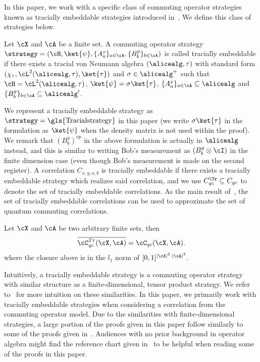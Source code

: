 In this paper, we work with a specific class of commuting operator strategies known as tracially embeddable strategies introduced in~\cite{linTracialEmbeddableStrategies2024}. We define this class of strategies below.
\begin{definition} \label{def:Tracialemd}
	Let $\cX$ and $\cA$ be a finite set. A commuting operator strategy $\strategy = (\cH, \ket{\psi},\{A_a^x \}_{a \in \cA} , \{B_b^y\}_{b \in \cA})$ is called tracially embeddable if there exists a tracial von Neumann algebra $(\alicealg, \tau)$ with standard form $(\chi_{\tau}, \cL^2(\alicealg, \tau), \ket{\tau})$ and $\sigma \in \alicealg^{+}$ such that $\cH = \cL^2(\alicealg, \tau)$, $\ket{\psi} = \sigma \ket{\tau}$, $\{A_a^x \}_{a \in \cA} \subseteq \alicealg$ and $ \{B_b^y\}_{b \in \cA} \subseteq \alicealg'$. 
\end{definition}
We represent a tracially embeddable strategy as $\strategy = \text{\gls{Tracialstrategy}}$ in this paper (we write $\sigma \ket{\tau}$ in the formulation as $\ket{\psi}$ when the density matrix is not used within the proof). We remark that $(B_b^y)^{op}$ in the above formulation is actually in $\alicealg$ instead, and this is similar to writing Bob's measurement as $(B^y_b \otimes \cI)$ in the finite dimension case (even though Bob's measurement is made on the second register). A correlation $C_{x,y,a,b}$ is tracially embeddable if there exists a tracially embeddable strategy which realizes said correlation, and we use $C^{\Tr}_{qc} \subseteq C_{qc} $ to denote the set of tracially embeddable correlations. As the main result of~\cite{linTracialEmbeddableStrategies2024}, the set of tracially embeddable correlations can be used to approximate the set of quantum commuting correlations. 
\begin{theorem} \label{thm:tracialembedding}
	Let $\cX$ and $\cA$ be two arbitrary finite sets, then
	\begin{equation*}
		\overline{\cC_{qc}^{Tr}(\cX, \cA)} = \cC_{qc}(\cX, \cA).
	\end{equation*}
	where the closure above is in the $l_1$ norm of $[0,1]^{|\cX|^2 \cdot |\cA|^2}$. 
\end{theorem}
Intuitively, a tracially embeddable strategy is a commuting operator strategy with similar structure as a finite-dimensional, tensor product strategy. We refer to~\cite[Example 3.3]{linTracialEmbeddableStrategies2024} for more intuition on these similarities. In this paper, we primarily work with tracially embeddable strategies when considering a correlation from the commuting operator model. Due to the similarities with finite-dimensional strategies, a large portion of the proofs given in this paper follow similarly to some of the proofs given in~\cite{jiMIPRE2022a}. Audiences with no prior background in operator algebra might find the reference chart given in~ to be helpful when reading some of the proofs in this paper. 

